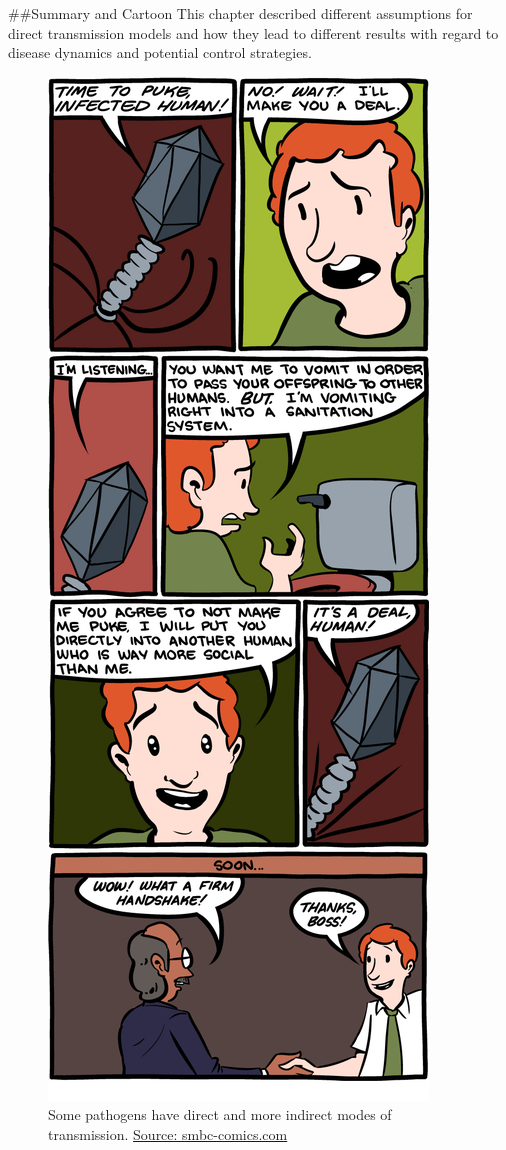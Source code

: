 \documentclass[]{book}
\theoremstyle{definition}
\theoremstyle{definition}
\theoremstyle{definition}
\theoremstyle{remark}
\begin{document}
\#\#Summary and Cartoon This chapter described different assumptions for
direct transmission models and how they lead to different results with
regard to disease dynamics and potential control strategies.

\begin{figure}
\centering
\includegraphics{./images/smbctransmissionmode.png}
\caption{Some pathogens have direct and more indirect modes of
transmission. \href{http://www.smbc-comics.com/}{Source:
smbc-comics.com}}
\end{figure}
\end{document}
